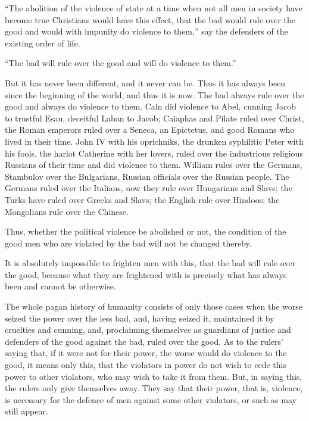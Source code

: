 \documentclass{book}
\begin{document}
“The abolition of the violence of state at a time when not all men in society have become true Christians would have this effect, that the bad would rule over the good and would with impunity do violence to them,” say the defenders of the existing order of life.

“The bad will rule over the good and will do violence to them.”

But it has never been different, and it never can be. Thus it has always been since the beginning of the world, and thus it is now. The bad always rule over the good and always do violence to them. Cain did violence to Abel, cunning Jacob to trustful Esau, deceitful Laban to Jacob; Caiaphas and Pilate ruled over Christ, the Roman emperors ruled over a Seneca, an Epictetus, and good Romans who lived in their time. John IV with his oprichniks, the drunken syphilitic Peter with his fools, the harlot Catherine with her lovers, ruled over the industrious religious Russians of their time and did violence to them. William rules over the Germans, Stambulov over the Bulgarians, Russian officials over the Russian people. The Germans ruled over the Italians, now they rule over Hungarians and Slavs; the Turks have ruled over Greeks and Slavs; the English rule over Hindoos; the Mongolians rule over the Chinese.

Thus, whether the political violence be abolished or not, the condition of the good men who are violated by the bad will not be changed thereby.

It is absolutely impossible to frighten men with this, that the bad will rule over the good, because what they are frightened with is precisely what has always been and cannot be otherwise.

The whole pagan history of humanity consists of only those cases when the worse seized the power over the less bad, and, having seized it, maintained it by cruelties and cunning, and, proclaiming themselves as guardians of justice and defenders of the good against the bad, ruled over the good. As to the rulers’ saying that, if it were not for their power, the worse would do violence to the good, it means only this, that the violators in power do not wish to cede this power to other violators, who may wish to take it from them. But, in saying this, the rulers only give themselves away. They say that their power, that is, violence, is necessary for the defence of men against some other violators, or such as may still appear.\footnotemark[1]
\end{document}
